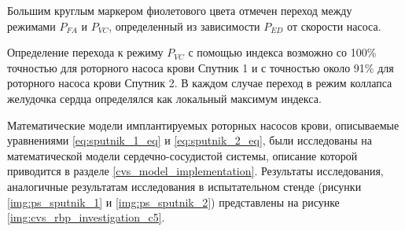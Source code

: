 Большим круглым маркером фиолетового цвета отмечен переход между режимами $P_{FA}$ и $P_{VC}$, определенный из зависимости $P_{ED}$ от скорости насоса. 

Определение перехода к режиму  $P_{VC}$ с помощью индекса возможно со 100\% точностью для роторного насоса крови Спутник 1 и с точностью около 91\% для роторного насоса крови Спутник 2. В каждом случае переход в режим коллапса желудочка сердца определялся как локальный максимум индекса. 

Математические модели имплантируемых роторных насосов крови, описываемые уравнениями \eqref{eq:sputnik_1_eq} и \eqref{eq:sputnik_2_eq}, были исследованы на математической модели сердечно-сосудистой системы, описание которой приводится в разделе \ref{cvs_model_implementation}.
Результаты исследования, аналогичные результатам исследования в испытательном стенде (рисунки \ref{img:ps_sputnik_1} и \ref{img:ps_sputnik_2}) представлены на рисунке \ref{img:cvs_rbp_investigation_c5}.

